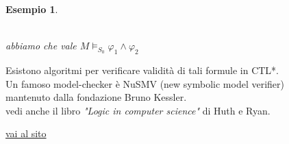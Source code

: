 \documentclass[a4paper,12pt]{article}
\theoremstyle{def}
\theoremstyle{prop}
\theoremstyle{esempio}
\newtheorem*{example}{Esempio}
\theoremstyle{dimostrazione}
\theoremstyle{teo}
\theoremstyle{osservazione}
\begin{document}
\begin{example}
\begin{center}
\\
		abbiamo che vale \(M \vDash_{S_0} \varphi_1 \land \varphi_2\)
	\end{center}
\end{example}
Esistono algoritmi per verificare validità di tali formule in CTL*.\\
Un famoso model-checker è NuSMV (new symbolic model verifier)\\
mantenuto dalla fondazione Bruno Kessler.\\
vedi anche il libro \textit{"Logic in computer science"} di Huth e Ryan.
\begin{center}
	\href{https://nusmv.fbk.eu}{vai al sito}\\
\end{center}
\end{document}
